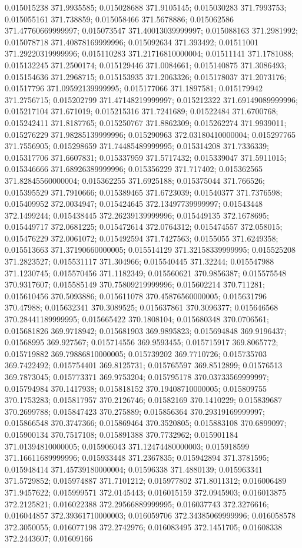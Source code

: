 0.015015238 371.9935585; 0.015028688 371.9105145; 0.015030283 371.7993753; 0.015055161 371.738859; 0.015058466 371.5678886; 0.015062586 371.47760669999997; 0.015073547 371.40013039999997; 0.015088163 371.2981992; 0.015078718 371.40878169999996; 0.015092634 371.393492; 0.01511001 371.29220319999996; 0.015110283 371.21716810000004; 0.01511141 371.1781088; 0.015132245 371.2500174; 0.015129446 371.0084661; 0.015140875 371.3086493; 0.015154636 371.2968715; 0.015153935 371.2063326; 0.015178037 371.2073176; 0.01517796 371.09592139999995; 0.015177066 371.1897581; 0.015179942 371.2756715; 0.015202799 371.47148219999997; 0.015212322 371.69149089999996; 0.015217104 371.671019; 0.015215316 371.7241689; 0.01522484 371.6700768; 0.015242411 371.8187765; 0.015250767 371.8862309; 0.015262274 371.9939011; 0.015276229 371.98285139999996; 0.015290963 372.03180410000004; 0.015297765 371.7556905; 0.015298659 371.74485489999995; 0.015314208 371.7336339; 0.015317706 371.6607831; 0.015337959 371.5717432; 0.015339047 371.5911015; 0.015346666 371.68926389999996; 0.015356229 371.717402; 0.015362565 371.82845560000004; 0.015362255 371.6925188; 0.015375044 371.766526; 0.015395529 371.7910666; 0.015389465 371.6723039; 0.01540377 371.7376598; 0.015409952 372.0034947; 0.015424645 372.13497739999997; 0.01543448 372.1499244; 0.015438445 372.26239139999996; 0.015449135 372.1678695; 0.015449717 372.0681225; 0.015472614 372.0764312; 0.015474557 372.058015; 0.015476229 372.0061072; 0.015492594 371.7427563; 0.0155055 371.6249358; 0.015513663 371.37190660000005; 0.015514129 371.32158339999995; 0.015525208 371.2823527; 0.015531117 371.304966; 0.015540445 371.32244; 0.015547988 371.1230745; 0.015570456 371.1182349; 0.015560621 370.9856387; 0.015575548 370.9317607; 0.015585149 370.75809219999996; 0.015602214 370.711281; 0.015610456 370.5093886; 0.015611078 370.45876560000005; 0.015631796 370.47988; 0.015632341 370.3089525; 0.015637861 370.3096377; 0.015646568 370.28441189999995; 0.015665422 370.1808104; 0.015680348 370.0706561; 0.015681826 369.9718942; 0.015681903 369.9895823; 0.015694848 369.9196437; 0.01568995 369.927567; 0.015714556 369.9593455; 0.015715917 369.8065772; 0.015719882 369.79886810000005; 0.015739202 369.7710726; 0.015735703 369.7422492; 0.015754401 369.8125731; 0.015765597 369.8512899; 0.01576513 369.7873045; 0.015773371 369.9753204; 0.015795178 370.03733569999997; 0.015794984 370.1417938; 0.015818152 370.19408710000005; 0.015809755 370.1753283; 0.015817957 370.2126746; 0.01582169 370.1410229; 0.015839687 370.2699788; 0.015847423 370.275889; 0.015856364 370.29319169999997; 0.015866548 370.3747366; 0.015869464 370.3520805; 0.015883108 370.6899097; 0.015900134 370.7517108; 0.015891388 370.7732962; 0.015901184 371.01394810000005; 0.015906043 371.12474480000003; 0.015918599 371.16611689999996; 0.015933448 371.2367835; 0.015942894 371.3781595; 0.015948414 371.45739180000004; 0.01596338 371.4880139; 0.015963341 371.5729852; 0.015974887 371.7101212; 0.015977802 371.8011312; 0.016006489 371.9457622; 0.015999571 372.0145443; 0.016015159 372.0945903; 0.016013875 372.2125821; 0.016022388 372.29566889999995; 0.016037743 372.3276616; 0.016044857 372.39361710000003; 0.016059706 372.34385069999996; 0.016058578 372.3050055; 0.016077198 372.2742976; 0.016083495 372.1451705; 0.01608338 372.2443607; 0.01609166 